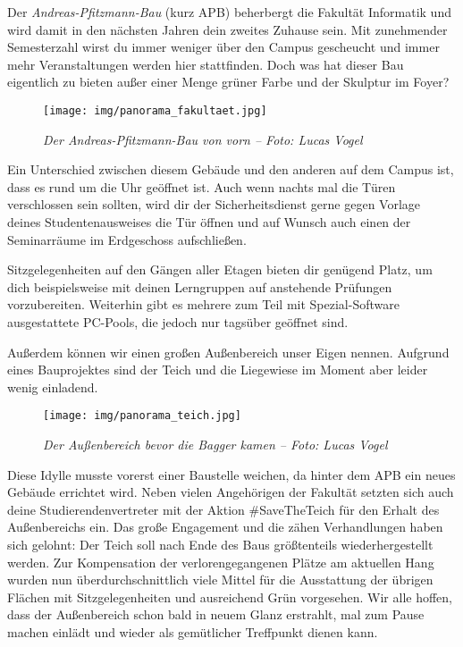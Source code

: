 
Der \emph{Andreas-Pfitzmann-Bau} (kurz APB) beherbergt die Fakultät Informatik und wird damit in den nächsten Jahren dein zweites Zuhause sein.
Mit zunehmender Semesterzahl wirst du immer weniger über den Campus gescheucht und immer mehr Veranstaltungen werden hier stattfinden.
Doch was hat dieser Bau eigentlich zu bieten außer einer Menge grüner Farbe und der Skulptur im Foyer?

\begin{figure}[h!]
    \centering
    \texttt{[image: img/panorama\_fakultaet.jpg]}
    \caption*{\small \textit{Der Andreas-Pfitzmann-Bau von vorn -- Foto: Lucas Vogel}}
\end{figure}

Ein Unterschied zwischen diesem Gebäude und den anderen auf dem Campus ist, dass es rund um die Uhr geöffnet ist. Auch wenn nachts mal die Türen verschlossen sein sollten, wird dir der Sicherheitsdienst gerne gegen Vorlage deines Studentenausweises die Tür öffnen und auf Wunsch auch einen der Seminarräume im Erdgeschoss aufschließen.

Sitzgelegenheiten auf den Gängen aller Etagen bieten dir genügend Platz, um dich beispielsweise mit deinen Lerngruppen auf anstehende Prüfungen vorzubereiten. Weiterhin gibt es mehrere zum Teil mit Spezial-Software ausgestattete PC-Pools, die jedoch nur tagsüber geöffnet sind.

\label{sec:apb}
Außerdem können wir einen großen Außenbereich unser Eigen nennen. Aufgrund eines Bauprojektes sind der Teich und die Liegewiese im Moment aber leider wenig einladend. 

\begin{figure}[t]
    \centering
    \texttt{[image: img/panorama\_teich.jpg]}
    \caption*{\small \textit{Der Außenbereich bevor die Bagger kamen -- Foto: Lucas Vogel}}
\end{figure}

Diese Idylle musste vorerst einer Baustelle weichen, da hinter dem APB ein neues Gebäude errichtet wird. Neben vielen Angehörigen der Fakultät setzten sich auch deine Studierendenvertreter mit der Aktion \#SaveTheTeich für den Erhalt des Außenbereichs ein.
Das große Engagement und die zähen Verhandlungen haben sich gelohnt: Der Teich soll nach Ende des Baus größtenteils wiederhergestellt werden. Zur Kompensation der verlorengegangenen Plätze am aktuellen Hang wurden nun überdurchschnittlich viele Mittel für die Ausstattung der übrigen Flächen mit Sitzgelegenheiten und ausreichend Grün vorgesehen. Wir alle hoffen, dass der Außenbereich schon bald in neuem Glanz erstrahlt, mal zum Pause machen einlädt und wieder als gemütlicher Treffpunkt dienen kann.


